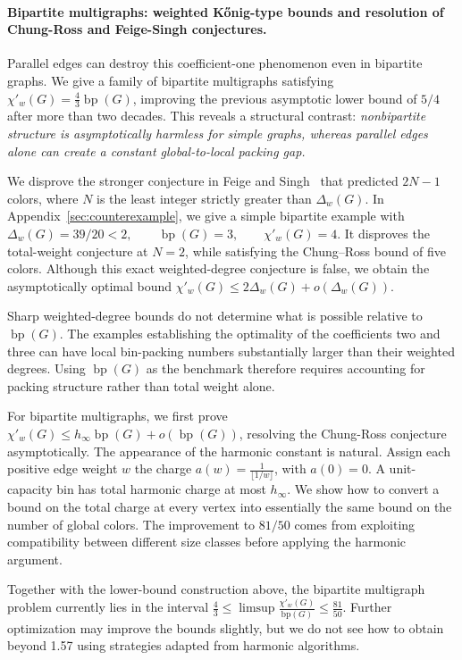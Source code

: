 \documentclass[11pt]{article}
\theoremstyle{definition}\newtheorem{algorithm}{Algorithm}[section]
\numberwithin{equation}{section}
\theoremstyle{remark}\newtheorem*{remark}{Remark}
\newcommand{\bp}{\operatorname{bp}}
\newcommand{\dw}{\Delta_w}
\newcommand{\cw}{\chi'_w}
\begin{document}
  
\paragraph{Bipartite multigraphs: 
weighted K\H{o}nig-type bounds and 
 resolution of Chung-Ross and Feige-Singh conjectures.}
Parallel edges can destroy this coefficient-one phenomenon even in
bipartite graphs. We give a family of bipartite multigraphs satisfying
$\cw(G)=\frac43\bp(G)$, improving the previous asymptotic lower bound
of $5/4$~\cite{NV} after more than two decades. This reveals a structural
contrast: \emph{nonbipartite structure is asymptotically harmless for
simple graphs, whereas parallel edges alone can create a constant
global-to-local packing gap.}

We disprove the stronger conjecture in Feige and Singh~\cite[Conjecture~1.2]{FS} that predicted $2N-1$ colors, where $N$ is the least integer strictly greater than $\Delta_w(G)$.  In
Appendix~\ref{sec:counterexample}, we give a simple bipartite example with
 $\Delta_w(G)=39/20<2,\qquad \bp(G)=3,\qquad \chi'_w(G)=4$. 
It disproves the total-weight conjecture at $N=2$, while satisfying the
Chung--Ross bound of five colors.
Although this exact weighted-degree conjecture is false, we obtain the
asymptotically optimal bound
$\cw(G)\le2\dw(G)+o(\dw(G))$. 

Sharp weighted-degree bounds do not determine what is possible relative
to $\bp(G)$. The examples establishing the optimality of the coefficients
two and three can have local bin-packing numbers substantially larger
than their weighted degrees. Using $\bp(G)$ as the benchmark therefore
requires accounting for packing structure rather than total weight alone.

For bipartite multigraphs, we first prove
$\cw(G)\le h_\infty\bp(G)+o(\bp(G))$, resolving the Chung-Ross conjecture asymptotically. The appearance of the harmonic
constant is natural. Assign each positive edge weight $w$ the charge
$a(w)=\frac1{\lfloor1/w\rfloor}$,
with $a(0)=0$. A unit-capacity bin has total harmonic charge at most
$h_\infty$. We show how to convert a bound on the total charge at every
vertex into essentially the same bound on the number of global colors.
The improvement to $81/50$ comes from exploiting compatibility between
different size classes before applying the harmonic argument.
  
Together with the lower-bound construction above, the bipartite multigraph problem currently lies in the interval
$\frac43
    \le
    \limsup\frac{\chi'_w(G)}{\mathrm{bp}(G)}
    \le
    \frac{81}{50}$.
Further optimization may improve the bounds slightly, but we do not see how to obtain beyond 1.57 using strategies adapted from harmonic algorithms.
\end{document}
